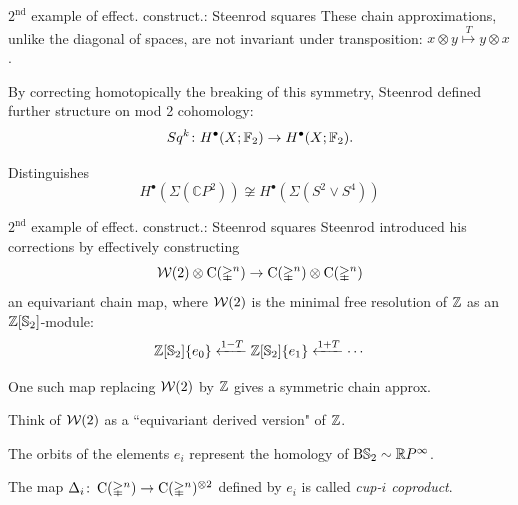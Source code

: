 \documentclass[10pt,t]{beamer} %
\begin{document}
\begin{frame}{$2^{\mathrm{nd}}$ example of effect. construct.: Steenrod squares}
	\pause These chain approximations, unlike the diagonal of spaces, are \textcolor{pblue}{not} invariant under transposition: $x \otimes y \stackrel{T}{\mapsto} y \otimes x$.
	\begin{center}
	\end{center}

	\medskip \pause By correcting homotopically the breaking of this symmetry, Steenrod defined further structure on mod 2 cohomology:
	\[
	Sq^k \colon H^\bullet(X; {\mathbb{F}_2}) \to H^\bullet(X; {\mathbb{F}_2}).
	\]

	\medskip \pause \textcolor{pblue}{Distinguishes}
	\[
	H^\bullet(\Sigma(\mathbb{C} P^2)) \not\cong H^\bullet(\Sigma(S^2 \vee S^4))
	\]
\end{frame}

\begin{frame}{$2^{\mathrm{nd}}$ example of effect. construct.: Steenrod squares}
	\medskip \pause Steenrod introduced his corrections by effectively constructing
	\[
	\mathcal{W}(2) \otimes \operatorname{C}(\mathbb{\Delta}^n) \to \operatorname{C}(\mathbb{\Delta}^n) \otimes \operatorname{C}(\mathbb{\Delta}^n)
	\]
	an equivariant chain map, where $\mathcal{W}(2)$ is the minimal free resolution of $\mathbb{Z}$ as an $\mathbb{Z}[\mathbb{S}_2]$-module:
	\[
	\mathbb{Z}[\mathbb{S}_2]\{e_0\} \xleftarrow{1-T} \mathbb{Z}[\mathbb{S}_2]\{e_1\} \xleftarrow{1+T} \dotsb
	\]

	\pause One such map replacing $\mathcal{W}(2)$ by $\mathbb{Z}$ gives a symmetric chain approx.

	\smallskip Think of $\mathcal{W}(2)$ as a ``equivariant derived version" of $\mathbb{Z}$.

	\pause \medskip The orbits of the elements $e_i$ represent the homology of $\mathrm{B} \mathbb{S}_2 \sim \mathbb{R} P^\infty$.

	\bigskip \pause The map $\Delta_i \colon \operatorname{C}(\mathbb{\Delta}^n) \to \operatorname{C}(\mathbb{\Delta}^n)^{\otimes 2}$ defined by $e_i$ is called \textit{cup-$i$ coproduct}.
\end{frame}
\end{document}
